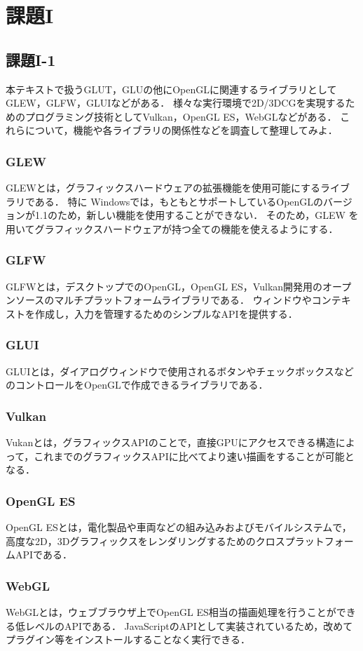 \documentclass[]{jarticle}
\begin{document}
\section{課題I}
\subsection{課題I-1}
本テキストで扱うGLUT，GLUの他にOpenGLに関連するライブラリとしてGLEW，GLFW，GLUIなどがある．
様々な実行環境で2D/3DCGを実現するためのプログラミング技術としてVulkan，OpenGL ES，WebGLなどがある．
これらについて，機能や各ライブラリの関係性などを調査して整理してみよ．
%
\subsubsection{GLEW}
GLEWとは，グラフィックスハードウェアの拡張機能を使用可能にするライブラリである．
特に Windowsでは，もともとサポートしているOpenGLのバージョンが1.1のため，新しい機能を使用することができない．
そのため，GLEW を用いてグラフィックスハードウェアが持つ全ての機能を使えるようにする．
%
\subsubsection{GLFW}
GLFWとは，デスクトップでのOpenGL，OpenGL ES，Vulkan開発用のオープンソースのマルチプラットフォームライブラリである．
ウィンドウやコンテキストを作成し，入力を管理するためのシンプルなAPIを提供する．
%
\subsubsection{GLUI}
GLUIとは，ダイアログウィンドウで使用されるボタンやチェックボックスなどのコントロールをOpenGLで作成できるライブラリである．
%
\subsubsection{Vulkan}
Vukanとは，グラフィックスAPIのことで，直接GPUにアクセスできる構造によって，これまでのグラフィックスAPIに比べてより速い描画をすることが可能となる．
%
\subsubsection{OpenGL ES}
OpenGL ESとは，電化製品や車両などの組み込みおよびモバイルシステムで，高度な2D，3DグラフィックスをレンダリングするためのクロスプラットフォームAPIである．
% 
\subsubsection{WebGL}
WebGLとは，ウェブブラウザ上でOpenGL ES相当の描画処理を行うことができる低レベルのAPIである．
JavaScriptのAPIとして実装されているため，改めてプラグイン等をインストールすることなく実行できる．
%
%
\end{document}
